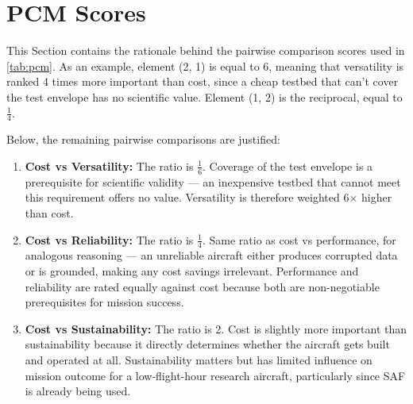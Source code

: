\section{PCM Scores}
This Section contains the rationale behind the pairwise comparison scores used in \autoref{tab:pcm}. As an example, element (2, 1) is equal to 6, meaning that versatility is ranked 4 times more important than cost, since a cheap testbed that can't cover the test envelope has no scientific value. Element (1, 2) is the reciprocal, equal to $\frac{1}{4}$.

Below, the remaining pairwise comparisons are justified: 
\begin{enumerate}
    \item \textbf{Cost vs Versatility:} The ratio is $\frac{1}{6}$. Coverage of the test envelope is a prerequisite for scientific validity — an inexpensive testbed that cannot meet this requirement offers no value. Versatility is therefore weighted 6× higher than cost.
    \item \textbf{Cost vs Reliability:} The ratio is $\frac{1}{4}$. Same ratio as cost vs performance, for analogous reasoning — an unreliable aircraft either produces corrupted data or is grounded, making any cost savings irrelevant. Performance and reliability are rated equally against cost because both are non-negotiable prerequisites for mission success.
    \item \textbf{Cost vs Sustainability:} The ratio is 2. Cost is slightly more important than sustainability because it directly determines whether the aircraft gets built and operated at all. Sustainability matters but has limited influence on mission outcome for a low-flight-hour research aircraft, particularly since SAF is already being used.

\end{enumerate}
